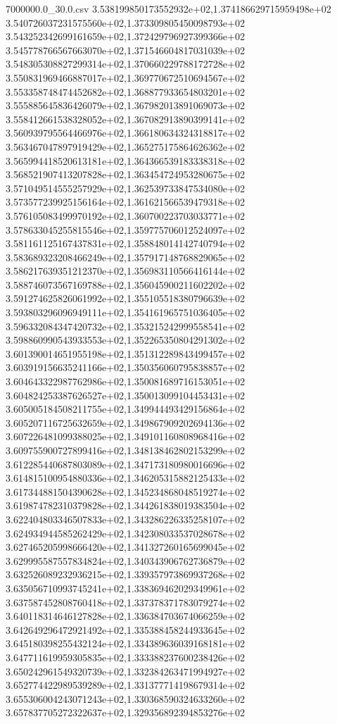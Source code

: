\begin{filecontents*}{7000000.0_30.0.csv}
3.538199850173552932e+02,1.374186629715959498e+02
3.540726037231575560e+02,1.373309805450098793e+02
3.543252342699161659e+02,1.372429796927399366e+02
3.545778766567663070e+02,1.371546604817031039e+02
3.548305308827299314e+02,1.370660229788172728e+02
3.550831969466887017e+02,1.369770672510694567e+02
3.553358748474452682e+02,1.368877933654803201e+02
3.555885645836426079e+02,1.367982013891069073e+02
3.558412661538328052e+02,1.367082913890399141e+02
3.560939795564466976e+02,1.366180634324318817e+02
3.563467047897919429e+02,1.365275175864626362e+02
3.565994418520613181e+02,1.364366539183338318e+02
3.568521907413207828e+02,1.363454724953280675e+02
3.571049514555257929e+02,1.362539733847534080e+02
3.573577239925156164e+02,1.361621566539479318e+02
3.576105083499970192e+02,1.360700223703033771e+02
3.578633045255815546e+02,1.359775706012524097e+02
3.581161125167437831e+02,1.358848014142740794e+02
3.583689323208466249e+02,1.357917148768829065e+02
3.586217639351212370e+02,1.356983110566416144e+02
3.588746073567169788e+02,1.356045900211602202e+02
3.591274625826061992e+02,1.355105518380796639e+02
3.593803296096949111e+02,1.354161965751036405e+02
3.596332084347420732e+02,1.353215242999558541e+02
3.598860990543933553e+02,1.352265350804291302e+02
3.601390014651955198e+02,1.351312289843499457e+02
3.603919156635241166e+02,1.350356060795838857e+02
3.604643322987762986e+02,1.350081689716153051e+02
3.604824253387626527e+02,1.350013099104453431e+02
3.605005184508211755e+02,1.349944493429156864e+02
3.605207116725632659e+02,1.349867909202694136e+02
3.607226481099388025e+02,1.349101160808968416e+02
3.609755900727899416e+02,1.348138462802153299e+02
3.612285440687803089e+02,1.347173180980016696e+02
3.614815100954880336e+02,1.346205315882125433e+02
3.617344881504390628e+02,1.345234868048519274e+02
3.619874782310379828e+02,1.344261838019383504e+02
3.622404803346507833e+02,1.343286226335258107e+02
3.624934944585262429e+02,1.342308033537028678e+02
3.627465205998666420e+02,1.341327260165699045e+02
3.629995587557834824e+02,1.340343906762736879e+02
3.632526089232936215e+02,1.339357973869937268e+02
3.635056710993745241e+02,1.338369462029349961e+02
3.637587452808760418e+02,1.337378371783079274e+02
3.640118314646127828e+02,1.336384703674066259e+02
3.642649296472921492e+02,1.335388458244933645e+02
3.645180398255432124e+02,1.334389636039168181e+02
3.647711619959305835e+02,1.333388237600238426e+02
3.650242961549320739e+02,1.332384263471994927e+02
3.652774422989539289e+02,1.331377714198679314e+02
3.655306004243071243e+02,1.330368590324633260e+02
3.657837705272322637e+02,1.329356892394853276e+02

\end{filecontents*}
